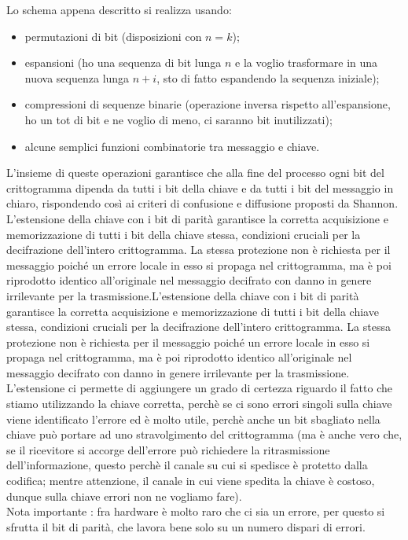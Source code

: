 Lo schema appena descritto si realizza usando:
\begin{itemize}
	\item permutazioni di bit (disposizioni con $n = k$);
	\item espansioni (ho una sequenza di bit lunga $n$ e la voglio trasformare in una nuova sequenza lunga $n + i$, sto di fatto espandendo la sequenza iniziale);
	\item compressioni di sequenze binarie (operazione inversa rispetto all'espansione, ho un tot di bit e ne voglio di meno, ci saranno bit inutilizzati);
	\item alcune semplici funzioni combinatorie tra messaggio e chiave.
\end{itemize}
 L’insieme di queste operazioni garantisce che alla fine del processo ogni bit del crittogramma dipenda da tutti i bit della chiave e da tutti i bit del messaggio in chiaro, rispondendo così ai criteri di confusione e diffusione proposti da Shannon.
 L’estensione della chiave con i bit di parità garantisce la corretta acquisizione e memorizzazione di tutti i bit della chiave stessa, condizioni cruciali per la decifrazione dell’intero crittogramma. La stessa protezione non è richiesta per il messaggio poiché un errore locale in esso si propaga nel crittogramma, ma è poi riprodotto identico all’originale nel messaggio decifrato con danno in genere
irrilevante per la trasmissione.L’estensione della chiave con i bit di parità garantisce la corretta acquisizione e memorizzazione di tutti i bit della chiave stessa, condizioni cruciali per la decifrazione dell’intero crittogramma. La stessa protezione non è richiesta per il messaggio poiché un errore locale in esso si propaga nel crittogramma, ma è poi riprodotto identico all’originale nel messaggio decifrato con danno in genere
 irrilevante per la trasmissione. L'estensione ci permette di aggiungere un grado di certezza riguardo il fatto che stiamo utilizzando la chiave corretta, perchè se ci sono errori singoli sulla chiave viene identificato l'errore ed è molto utile, perchè anche un bit sbagliato nella chiave può portare ad uno stravolgimento del crittogramma (ma è anche vero che, se il ricevitore si accorge dell'errore può richiedere la ritrasmissione dell'informazione, questo perchè il canale su cui si spedisce è protetto dalla codifica; mentre attenzione, il canale in cui viene spedita la chiave è costoso, dunque sulla chiave errori non ne vogliamo fare). \\
 Nota importante : fra hardware è molto raro che ci sia un errore, per questo si sfrutta il bit di parità, che lavora bene solo su un numero dispari di errori.
